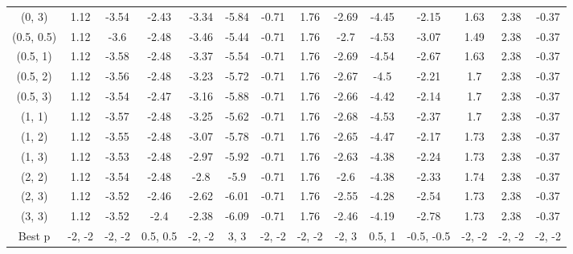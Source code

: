 \documentclass[11pt,a4paper,twoside,openany]{book}\usepackage{knitr}
\begin{document}
{\begin{knitrout}
\begin{landscape}
\begin{longtable}[t]{cccccccccccccc}
\addlinespace
(0, 3) & 1.12 & -3.54 & -2.43 & -3.34 & -5.84 & -0.71 & 1.76 & -2.69 & -4.45 & -2.15 & 1.63 & 2.38 & -0.37\\
(0.5, 0.5) & 1.12 & -3.6 & -2.48 & -3.46 & -5.44 & -0.71 & 1.76 & -2.7 & -4.53 & -3.07 & 1.49 & 2.38 & -0.37\\
(0.5, 1) & 1.12 & -3.58 & -2.48 & -3.37 & -5.54 & -0.71 & 1.76 & -2.69 & -4.54 & -2.67 & 1.63 & 2.38 & -0.37\\
(0.5, 2) & 1.12 & -3.56 & -2.48 & -3.23 & -5.72 & -0.71 & 1.76 & -2.67 & -4.5 & -2.21 & 1.7 & 2.38 & -0.37\\
(0.5, 3) & 1.12 & -3.54 & -2.47 & -3.16 & -5.88 & -0.71 & 1.76 & -2.66 & -4.42 & -2.14 & 1.7 & 2.38 & -0.37\\
\addlinespace
(1, 1) & 1.12 & -3.57 & -2.48 & -3.25 & -5.62 & -0.71 & 1.76 & -2.68 & -4.53 & -2.37 & 1.7 & 2.38 & -0.37\\
(1, 2) & 1.12 & -3.55 & -2.48 & -3.07 & -5.78 & -0.71 & 1.76 & -2.65 & -4.47 & -2.17 & 1.73 & 2.38 & -0.37\\
(1, 3) & 1.12 & -3.53 & -2.48 & -2.97 & -5.92 & -0.71 & 1.76 & -2.63 & -4.38 & -2.24 & 1.73 & 2.38 & -0.37\\
(2, 2) & 1.12 & -3.54 & -2.48 & -2.8 & -5.9 & -0.71 & 1.76 & -2.6 & -4.38 & -2.33 & 1.74 & 2.38 & -0.37\\
(2, 3) & 1.12 & -3.52 & -2.46 & -2.62 & -6.01 & -0.71 & 1.76 & -2.55 & -4.28 & -2.54 & 1.73 & 2.38 & -0.37\\
\addlinespace
(3, 3) & 1.12 & -3.52 & -2.4 & -2.38 & -6.09 & -0.71 & 1.76 & -2.46 & -4.19 & -2.78 & 1.73 & 2.38 & -0.37\\
Best p & -2, -2 & -2, -2 & 0.5, 0.5 & -2, -2 & 3, 3 & -2, -2 & -2, -2 & -2, 3 & 0.5, 1 & -0.5, -0.5 & -2, -2 & -2, -2 & -2, -2\\*
\end{longtable}
\end{landscape}


\end{knitrout}


\begin{table}[!h]


\end{table}}
\end{document}
